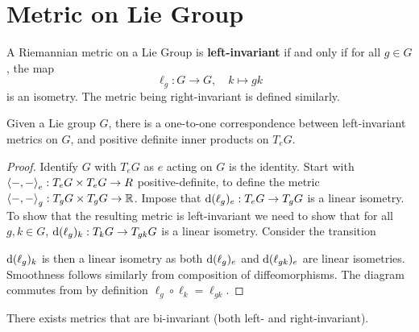 \documentclass{article}
\begin{document}
\section{Metric on Lie Group}

\begin{definition}[Invariance]
    A Riemannian metric on a Lie Group is \textbf{left-invariant} if and only if for all $g \in G$, the map
    \[
        \ell_g: G \to G, \quad k \mapsto gk
    \]
    is an isometry. The metric being right-invariant is defined similarly.
\end{definition}

\begin{proposition}
    Given a Lie group $G$, there is a one-to-one correspondence between left-invariant metrics on $G$, and positive definite inner products on $T_e G$.
\end{proposition}

\begin{proof}
    Identify $G$ with $T_e G$ as $e$ acting on $G$ is the identity. Start with $\left\langle -,- \right\rangle_e: T_e G \times T_e G \to R$ positive-definite, to define the metric $\left\langle -, - \right\rangle_g : T_g G \times T_g G \to \mathbb{R}$. Impose that $\mathrm{d} (\ell_g)_e : T_e G \to T_g G$ is a linear isometry. To show that the resulting metric is left-invariant we need to show that for all $g, k \in G$, $\mathrm{d} (\ell_g)_k: T_k G \to T_{gk} G$ is a linear isometry. Consider the transition

    \begin{minipage}{\linewidth}
        \centering
    \end{minipage}
    $\mathrm{d} (\ell_g)_k$ is then a linear isometry as both $\mathrm{d}(\ell_g)_e$ and $\mathrm{d}(\ell_{gk})_e$ are linear isometries. Smoothness follows similarly from composition of diffeomorphisms. The diagram commutes from by definition $\ell_g \circ \ell_k = \ell_{gk}$.
\end{proof}

\begin{remark}
    There exists metrics that are bi-invariant (both left- and right-invariant).
\end{remark}
\end{document}
